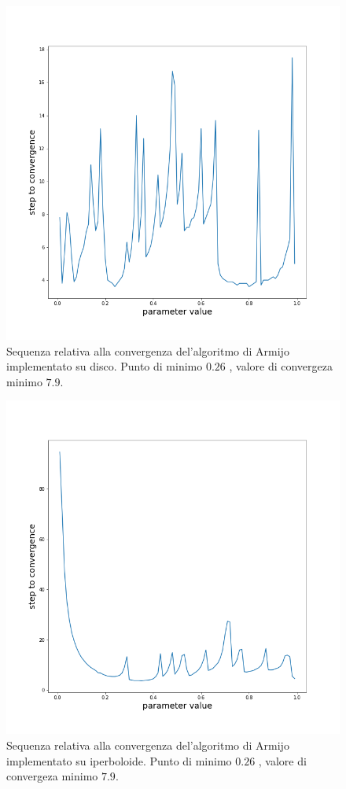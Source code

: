 \documentclass[a4paper, 12pt]{article}
\begin{document}
\begin{figure}[H] %
    \centering\includegraphics[width=1\textwidth]{armijo_parameter_poincare.png}
    \caption{Sequenza relativa alla convergenza del'algoritmo di Armijo implementato su disco. Punto di minimo $0.26$ , valore di convergeza minimo $7.9$.}
\end{figure}
\begin{figure}[H] %
    \centering\includegraphics[width=1\textwidth]{armijo_parameter_hyperboloid.png}
    \caption{Sequenza relativa alla convergenza del'algoritmo di Armijo implementato su iperboloide. Punto di minimo $0.26$ , valore di convergeza minimo $7.9$.}
\end{figure}
\end{document}
